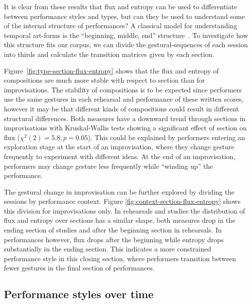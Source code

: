 \documentclass{sigchi}
\begin{document}
It is clear from these results that flux and entropy can be used to
differentiate between performance styles and types, but can they be
used to understand some of the internal structure of performances? A
classical model for understanding temporal art-forms is the
``beginning, middle, end'' structure~\cite{Aristotle:350rt}. To
investigate how this structure fits our corpus, we can divide the
gestural-sequences of each session into thirds and calculate the
transition matrices given by each section.

Figure~\ref{fig:type-section-flux-entropy} shows that the flux and
entropy of compositions are much more stable with respect to section
than for improvisations. The stability of compositions is to be
expected since performers use the same gestures in each rehearsal and
performance of these written scores, however it may be that different
kinds of compositions could result in different structural
differences. Both measures have a downward trend through sections in
improvisations with Kruskal-Wallis tests showing a significant effect
of section on flux ($\chi^2(2)=5.8, p=0.05$). This could be explained
by performers entering an exploration stage at the start of an
improvisation, where they change gesture frequently to experiment with
different ideas. At the end of an improvisation, performers may change
gesture less frequently while ``winding up'' the performance.

The gestural change in improvisation can be further explored by
dividing the sessions by performance context. Figure
\ref{fig:context-section-flux-entropy} shows this division for
improvisations only. In rehearsals and studies the distribution of
flux and entropy over sections has a similar shape, both measures drop
in the ending section of studies and after the beginning section in
rehearsals. In performances however, flux drops after the beginning
while entropy drops substantially in the ending section. This
indicates a more constrained performance style in this closing
section, where performers transition between fewer gestures in the
final section of performances.

\subsection{Performance styles over time}
\end{document}
